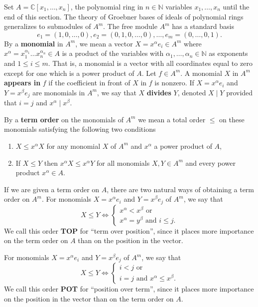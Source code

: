 \documentclass[12pt, a4paper]{article}
\begin{document}
Set $A = \mathbb{C}[x_1, \dots, x_n]$, the polynomial ring in $n \in \mathbb{N}$ variables $x_1, \dots, x_n$ until the end of this section.
The theory of Groebner bases of ideals of polynomial rings generalizes to submodules of $A^m$.
The free module $A^m$ has a standard basis
\begin{equation*}
  e_1 = (1, 0, \dots, 0), e_2 = (0, 1, 0, \dots, 0), \dots, e_m = (0, \dots, 0, 1).
\end{equation*}
By a \textbf{monomial} in $A^m$, we mean a vector $X = x^\alpha e_i \in A^m$ where $x^\alpha = x_1^{\alpha_1}\dots x_n^{\alpha_n} \in A$ is a product of the variables with $\alpha_1, \dots, \alpha_n \in \mathbb{N}$ as exponents and $1 \le i \le m$.
That is, a monomial is a vector with all coordinates equal to zero except for one which is a power product of $A$.
Let $f\in A^m$.
A monomial $X$ in $A^m$ \textbf{appears in} $f$ if the coefficient in front of $X$ in $f$ is nonzero.
If $X = x^\alpha e_i$ and $Y = x^\beta e_j$ are monomials in $A^m$, we say that $X$ \textbf{divides} $Y$, denoted $X \mid Y$ provided that $i = j$ and $x^\alpha \mid x^\beta$.

By a \textbf{term order} on the monomials of $A^m$ we mean a total order $\le$ on these monomials satisfying the following two conditions
\begin{enumerate}[label={(\alph*)}]
\item $X \le x^\alpha X$ for any monomial $X$ of $A^m$ and $x^\alpha$ a power product of $A$,
\item If $X \le Y$ then $x^\alpha X \le x^\alpha Y$ for all monomials $X, Y \in A^m$ and every power product $x^\alpha \in A$.
\end{enumerate}

If we are given a term order on $A$, there are two natural ways of obtaining a term order on $A^m$.
For monomials $X = x^\alpha e_i$ and $Y = x^\beta e_j$ of $A^m$, we say that
\begin{equation*}
  X \le Y \iff
  \begin{cases}
    x^\alpha < x^\beta \text{ or }\\
    x^\alpha = y^\beta\text{ and } i \le j.
  \end{cases}
\end{equation*}
We call this order \textbf{TOP} for ``term over position'', since it places more importance on the term order on $A$ than on the position in the vector.

For monomials $X = x^\alpha e_i$ and $Y = x^\beta e_j$ of $A^m$, we say that
\begin{equation*}
  X\le Y \iff
  \begin{cases}
    i<j \text{ or }\\
    i=j\text{ and } x^\alpha\le x^\beta.
  \end{cases}
\end{equation*}
We call this order \textbf{POT} for ``position over term'', since it places more importance on the position in the vector than on the term order on $A$.
\end{document}
